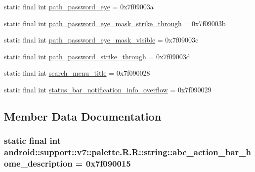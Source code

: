 \begin{CompactItemize}
\item 
static final int \hyperlink{classandroid_1_1support_1_1v7_1_1palette_1_1_r_1_1string_c81f68fffbae87260510a3c705a3876d}{path\_\-password\_\-eye} = 0x7f09003a
\item 
static final int \hyperlink{classandroid_1_1support_1_1v7_1_1palette_1_1_r_1_1string_bb3b2421e5c2db5dfeb6f7e2b59ac60f}{path\_\-password\_\-eye\_\-mask\_\-strike\_\-through} = 0x7f09003b
\item 
static final int \hyperlink{classandroid_1_1support_1_1v7_1_1palette_1_1_r_1_1string_350f77bda9b0ec51c12eba0161834f41}{path\_\-password\_\-eye\_\-mask\_\-visible} = 0x7f09003c
\item 
static final int \hyperlink{classandroid_1_1support_1_1v7_1_1palette_1_1_r_1_1string_bf7fcc17c1352384fe18b39296ed0476}{path\_\-password\_\-strike\_\-through} = 0x7f09003d
\item 
static final int \hyperlink{classandroid_1_1support_1_1v7_1_1palette_1_1_r_1_1string_6b6da2260519c34c63a600d39679840b}{search\_\-menu\_\-title} = 0x7f090028
\item 
static final int \hyperlink{classandroid_1_1support_1_1v7_1_1palette_1_1_r_1_1string_cc2cc841bf6b9e42a3ecd01dd0a3ec80}{status\_\-bar\_\-notification\_\-info\_\-overflow} = 0x7f090029
\end{CompactItemize}


\subsection{Member Data Documentation}
\hypertarget{classandroid_1_1support_1_1v7_1_1palette_1_1_r_1_1string_3ee4fa07a034eab0db74715838a423db}{
\subsubsection[{abc\_\-action\_\-bar\_\-home\_\-description}]{\setlength{\rightskip}{0pt plus 5cm}static final int android::support::v7::palette.R.R::string::abc\_\-action\_\-bar\_\-home\_\-description = 0x7f090015}}
\label{classandroid_1_1support_1_1v7_1_1palette_1_1_r_1_1string_3ee4fa07a034eab0db74715838a423db}


